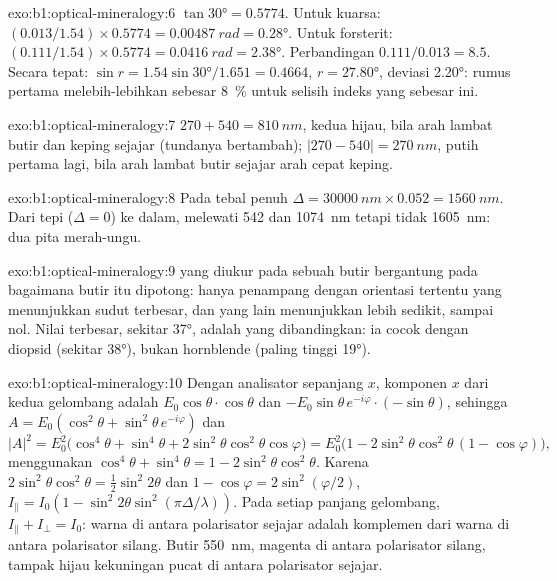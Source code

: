 \begin{solution}{exo:b1:optical-mineralogy:6}
$\tan\ang{30} = 0.5774$. Untuk kuarsa: $(0.013/1.54)\times0.5774 = \qty{0.00487}{rad}
= \ang{0.28}$. Untuk forsterit: $(0.111/1.54)\times0.5774 = \qty{0.0416}{rad} =
\ang{2.38}$. Perbandingan $0.111/0.013 = 8.5$. Secara tepat: $\sin r = 1.54\sin\ang{30}/1.651
= 0.4664$, $r = \ang{27.80}$, deviasi \ang{2.20}: rumus  pertama melebih-lebihkan sebesar \qty{8}{\percent} untuk selisih indeks yang sebesar ini.
\end{solution}

\begin{solution}{exo:b1:optical-mineralogy:7}
$270 + 540 = \qty{810}{nm}$,  kedua hijau, bila arah lambat butir dan keping sejajar (tundanya bertambah); $|270 - 540| =
\qty{270}{nm}$, putih  pertama lagi, bila arah lambat butir sejajar arah cepat keping.
\end{solution}

\begin{solution}{exo:b1:optical-mineralogy:8}
Pada tebal penuh $\Delta = \qty{30000}{nm}\times0.052 = \qty{1560}{nm}$. Dari tepi ($\Delta = 0$) ke dalam,  melewati 542 dan
\qty{1074}{nm} tetapi tidak \qty{1605}{nm}: dua pita merah-ungu.
\end{solution}

\begin{solution}{exo:b1:optical-mineralogy:9}
 yang diukur pada sebuah butir bergantung pada bagaimana butir itu dipotong: hanya penampang dengan orientasi tertentu yang menunjukkan sudut terbesar, dan yang lain menunjukkan lebih sedikit, sampai nol. Nilai terbesar, sekitar \ang{37}, adalah yang dibandingkan: ia cocok dengan diopsid (sekitar \ang{38}), bukan hornblende (paling tinggi \ang{19}).
\end{solution}

\begin{solution}{exo:b1:optical-mineralogy:10}
Dengan analisator sepanjang $x$, komponen $x$ dari kedua gelombang adalah
$E_0\cos\theta\cdot\cos\theta$ dan $-E_0\sin\theta\,e^{-i\varphi}\cdot(-\sin\theta)$,
sehingga $A = E_0(\cos^2\theta + \sin^2\theta\,e^{-i\varphi})$ dan
\[
  |A|^2 = E_0^2\bigl(\cos^4\theta + \sin^4\theta + 2\sin^2\theta\cos^2\theta\cos\varphi\bigr)
  = E_0^2\bigl(1 - 2\sin^2\theta\cos^2\theta\,(1 - \cos\varphi)\bigr),
\]
menggunakan $\cos^4\theta + \sin^4\theta = 1 - 2\sin^2\theta\cos^2\theta$. Karena
$2\sin^2\theta\cos^2\theta = \frac12\sin^2 2\theta$ dan $1 - \cos\varphi =
2\sin^2(\varphi/2)$, $I_\parallel = I_0(1 - \sin^2 2\theta\sin^2(\pi\Delta/\lambda))$.
Pada setiap panjang gelombang, $I_\parallel + I_\perp = I_0$: warna di antara polarisator sejajar adalah komplemen dari warna di antara polarisator silang. Butir \qty{550}{nm}, magenta di antara polarisator silang, tampak hijau kekuningan pucat di antara polarisator sejajar.
\end{solution}

